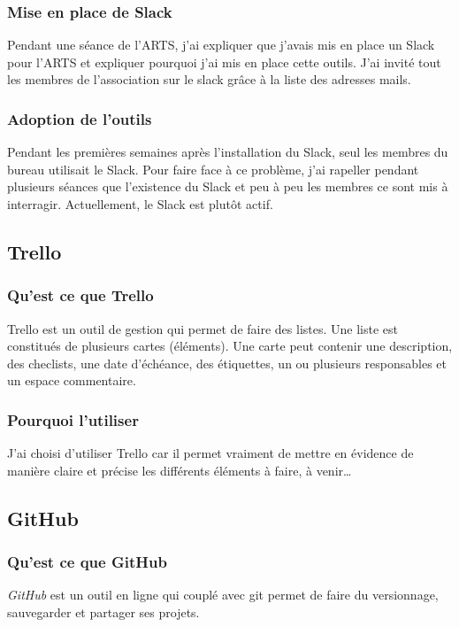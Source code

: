 \documentclass[11pt,a4paper]{report}
\begin{document}
      \subsubsection{Mise en place de Slack}
        Pendant une séance de l'ARTS, j'ai expliquer que j'avais mis en place un Slack pour l'ARTS et expliquer pourquoi j'ai mis en place cette outils.
        J'ai invité tout les membres de l'association sur le slack grâce à la liste des adresses mails.

      \subsubsection{Adoption de l'outils}
        Pendant les premières semaines après l'installation du Slack, seul les membres du bureau utilisait le Slack. Pour faire face à ce problème, j'ai rapeller pendant plusieurs séances que l'existence du Slack et peu à peu les membres ce sont mis à interragir.
        Actuellement, le Slack est plut\^ot actif.

    \subsection{Trello}
      \subsubsection{Qu'est ce que Trello}
        Trello est un outil de gestion qui permet de faire des listes. Une liste est constitués de plusieurs cartes (éléments). Une carte peut contenir une description, des checlists, une date d'échéance, des étiquettes, un ou plusieurs responsables et un espace commentaire.

      \subsubsection{Pourquoi l'utiliser}
        J'ai choisi d'utiliser Trello car il permet vraiment de mettre en évidence de manière claire et précise les différents éléments à faire, à venir…

    \subsection{GitHub}
      \subsubsection{Qu'est ce que GitHub}
        \emph{GitHub} est un outil en ligne qui couplé avec git permet de faire du versionnage, sauvegarder et partager ses projets.
\end{document}
